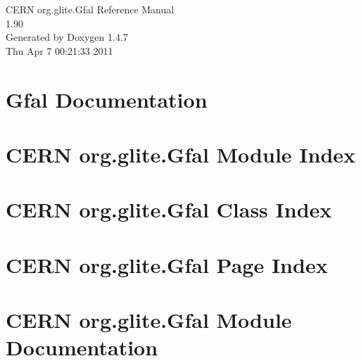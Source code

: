 \documentclass[a4paper]{book}
\begin{document}
\begin{titlepage}
\vspace*{7cm}
\begin{center}
{\Large CERN org.glite.Gfal Reference Manual\\[1ex]\large 1.90 }\\
\vspace*{1cm}
{\large Generated by Doxygen 1.4.7}\\
\vspace*{0.5cm}
{\small Thu Apr 7 00:21:33 2011}\\
\end{center}
\end{titlepage}
\clearemptydoublepage
{}
\tableofcontents
\clearemptydoublepage
{}
\chapter{Gfal Documentation }
\label{index}
\chapter{CERN org.glite.Gfal Module Index}

\chapter{CERN org.glite.Gfal Class Index}

\chapter{CERN org.glite.Gfal Page Index}

\chapter{CERN org.glite.Gfal Module Documentation}







\end{document}
